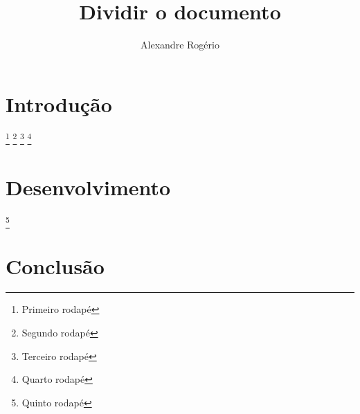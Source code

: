 \documentclass{article}
\begin{document}
	\title{\textbf{{\Huge Dividir o documento}}}
	\author{Alexandre Rogério}
	\maketitle
	\thispagestyle{empty}
	\newpage
	
	\setcounter{page}{1}
	\tableofcontents
	\newpage
	
	\listoffigures
	\newpage
	
	\listoftables
	\newpage
	
	\setcounter{page}{1}
	
	\section{Introdução}
		
		\footnote{Primeiro rodapé}
		\footnote{Segundo rodapé}
		\footnote{Terceiro rodapé}
		\footnote{Quarto rodapé}
	\section{Desenvolvimento}
		
		\footnote{Quinto rodapé}
	\section{Conclusão}
		
\end{document}
